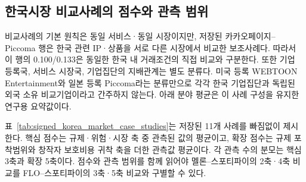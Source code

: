 \documentclass[11pt,a4paper]{report}
\begin{document}
\subsection{한국시장 비교사례의 점수와 관측 범위}
비교사례의 기본 원칙은 동일 서비스·동일 시장이지만, 저장된 카카오페이지--Piccoma 행은 한국 관련 IP·상품을 서로 다른 시장에서 비교한 보조사례다. 따라서 이 행의 0.100/0.133은 동일한 한국 내 거래조건의 직접 비교와 구분한다. 또한 기업 등록국, 서비스 시장국, 기업집단의 지배관계는 별도 분류다. 미국 등록 WEBTOON Entertainment와 일본 등록 Piccoma라는 분류만으로 각각 한국 기업집단과 독립된 외국 소유 비교기업이라고 간주하지 않는다. 아래 분야 평균은 이 사례 구성을 유지한 연구용 요약값이다.

표~\ref{tab:signed_korea_market_case_studies}는 저장된 11개 사례를 빠짐없이 제시한다. 핵심 점수는 규제·위험·시장 축 중 관측된 값의 평균이고, 확장 점수는 규제 포착범위와 창작자 보호비용 귀착 축을 더한 관측값 평균이다. 각 관측 수의 분모는 핵심 3축과 확장 5축이다. 점수와 관측 범위를 함께 읽어야 멜론--스포티파이의 2축·4축 비교를 FLO--스포티파이의 3축·5축 비교와 구별할 수 있다.
\end{document}

